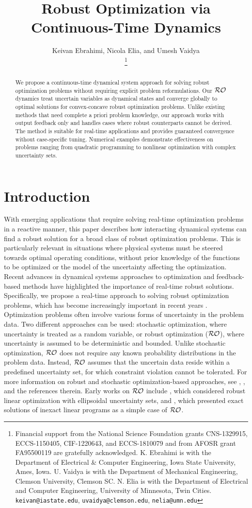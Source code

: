 \documentclass[journal,twoside,web]{ieeecolor}
\title{\LARGE \bf Robust Optimization via Continuous-Time Dynamics}
\author{Keivan Ebrahimi, Nicola Elia, and Umesh Vaidya\\
\thanks{Financial support from the National Science Foundation grants CNS-1329915, ECCS-1150405, CIF-1220643, and ECCS-1810079 and from AFOSR grant FA95500119 are gratefully acknowledged. K. Ebrahimi is with the Department of Electrical \& Computer Engineering, Iowa State University, Ames, Iowa. U. Vaidya is with the Department of Mechanical Engineering, Clemson University, Clemson SC.  N. Elia is with the Department of Electrical and Computer Engineering, University of Minnesota, Twin Cities.
{\tt\small keivan@iastate.edu},
{\tt\small uvaidya@clemson.edu},
{\tt\small nelia@umn.edu}
}}
\begin{document}
\pagestyle{headings}
\setcounter{page}{1}

\maketitle

\begin{abstract}
{\color{blue} We propose a continuous-time dynamical system approach for solving robust optimization problems without requiring explicit problem reformulations. Our ${\cal RO}$ dynamics treat uncertain variables as dynamical states and converge globally to optimal solutions for convex-concave robust optimization problems. Unlike existing methods that need complete a priori problem knowledge, our approach works with output feedback only and handles cases where robust counterparts cannot be derived. The method is suitable for real-time applications and provides guaranteed convergence without case-specific tuning. Numerical examples demonstrate effectiveness on problems ranging from quadratic programming to nonlinear optimization with complex uncertainty sets.}
\end{abstract}

\section{Introduction}

{\color{blue} With emerging applications that require solving real-time optimization problems in a reactive manner, this paper describes how interacting dynamical systems can find a robust solution for a broad class of robust optimization problems. This is particularly relevant in situations where physical systems must be steered towards optimal operating conditions, without prior knowledge of the functions to be optimized or the model of the uncertainty affecting the optimization. Recent advances in dynamical systems approaches to optimization \cite{aigner2023,zhang2023dynamics} and feedback-based methods \cite{zoranksg2023} have highlighted the importance of real-time robust solutions. Specifically, we propose a real-time approach to solving robust optimization problems, which has become increasingly important in recent years \cite{he2022}.} Optimization problems often involve various forms of uncertainty in the problem data. Two different approaches can be used: stochastic optimization, where uncertainty is treated as a random variable, or robust optimization (${\cal RO}$), where uncertainty is assumed to be deterministic and bounded. Unlike stochastic optimization, ${\cal RO}$ does not require any known probability distributions in the problem data. Instead, ${\cal RO}$ assumes that the uncertain data reside within a predefined uncertainty set, for which constraint violation cannot be tolerated. For more information on robust and stochastic optimization-based approaches, see \cite{bental2009}, \cite{bertsimas2011}, and the references therein. Early works on ${\cal RO}$ include \cite{soyster1976}, which considered robust linear optimization with ellipsoidal uncertainty sets, and \cite{falk1976}, which presented exact solutions of inexact linear programs as a simple case of ${\cal RO}$.
\end{document}
